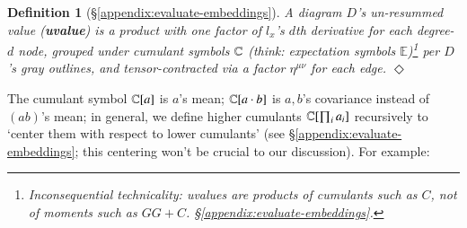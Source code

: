 \documentclass[anon,12pt]{colt2021} %
\newcommand{\translucent}[2]{\colorbox{#1}{#2}}
\newtheorem{dfn}{Definition}
\newcommand{\squash}{\vspace{-0.15cm}}
\newcommand{\wasq}[1]{\left[#1\right]}
\newcommand{\expc}{\mathbb{E}}
\newcommand{\omicron}{{\acute{o}}}
\newcommand{\mend}{\hfill $\Diamond$}
\begin{document}
            \squash
            \begin{dfn}[\S\ref{appendix:evaluate-embeddings}]\label{dfn:uvalue-body}
                \emph{
                    A diagram $D$'s \emph{un-resummed value} (\translucent{moolime}{\textbf{uvalue}})
                    is a product with one factor of $l_x$'s $d$th derivative
                    for each degree-$d$ node, grouped
                    under cumulant symbols $\mathbb{C}$ (think: expectation symbols $\expc$)\footnote{
                        Inconsequential technicality: uvalues are products of
                        \emph{cumulants} such as $C$, not of moments such as
                        $GG+C$.
                        \S\ref{appendix:evaluate-embeddings}.
                    }
                    per $D$'s gray outlines, and tensor-contracted 
                    via a %
                    factor $\eta^{\mu\nu}$ for each edge.
                }\mend
            \end{dfn}
            The cumulant symbol $\mathbb{C}[a]$ is $a$'s mean; $\mathbb{C}[a\cdot b]$ is
            $a,b$'s covariance instead of $(ab)$'s mean; in general, we
            define higher cumulants $\mathbb{C}[\prod_i a_i]$ recursively to `center
            them with respect to lower cumulants' (see 
            \S\ref{appendix:evaluate-embeddings};
            this centering won't be crucial to our discussion).  For example:
                \newcommand{\AAA}{{\color{black}\nabla_\mu}}
                \newcommand{\BBB}{{\color{black}\nabla_\nu}}
                \newcommand{\CCC}{{\color{black}\nabla_\xi}}
                \newcommand{\DDD}{{\color{black}\nabla_\omicron}}
                \newcommand{\EEE}{{\color{black}\nabla_\pi}}
                \newcommand{\FFF}{{\color{black}\nabla_\rho}}
                \newcommand{\ww}[1]{\,\CC[#1]\,}%
                \newcommand{\rRr}[1]{{\color{moor}#1}}
                \newcommand{\gGg}[1]{{\color{moog}#1}}
                \newcommand{\bBb}[1]{{\color{moob}#1}}
                \newcommand{\sixsum}{\textstyle\sum_{{\mu\nu\xi\omicron\pi\rho}} }
\end{document}
